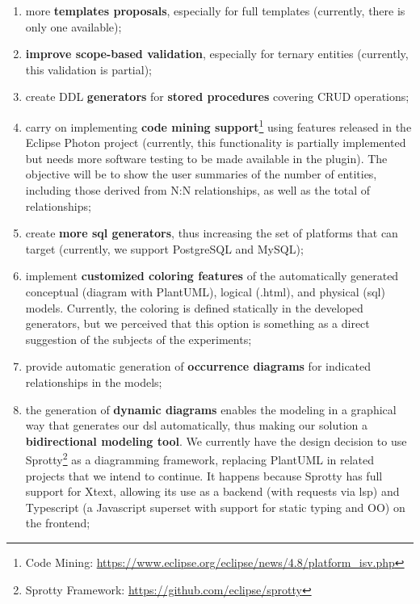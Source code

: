 \begin{enumerate} [label=\roman*.]
    \item more \textbf{templates proposals}, especially for full templates (currently, there is only one available);
    \item \textbf{improve scope-based validation}, especially for ternary entities (currently, this validation is partial);
    \item create DDL \textbf{generators} for \textbf{stored procedures} covering CRUD operations;
    \item carry on implementing  \textbf{code mining support}\footnote {Code Mining: \url{https://www.eclipse.org/eclipse/news/4.8/platform_isv.php}} using features released in the Eclipse Photon project (currently, this functionality is partially implemented but needs more software testing to be made available in the plugin).
    The objective will be to show the user summaries of the number of entities, including those derived from N:N relationships, as well as the total of relationships;
    \item create \textbf{more \ac{sql} generators}, thus increasing the set of platforms that can target (currently, we support PostgreSQL and MySQL);
    \item implement \textbf{customized coloring features} of the automatically generated conceptual (diagram with PlantUML), logical (.html), and physical (\ac{sql}) models. 
    Currently, the coloring is defined statically in the developed generators, but we perceived that this option is something as a direct suggestion of the subjects of the experiments;
    \item provide automatic generation of \textbf{occurrence diagrams} for indicated relationships in the models;
    \item the generation of \textbf{dynamic diagrams} enables the modeling in a graphical way that generates our \ac{dsl} automatically, thus making our solution a \textbf{bidirectional modeling tool}. We currently have the design decision to use Sprotty\footnote{Sprotty Framework: \url{https://github.com/eclipse/sprotty}} as a diagramming framework, replacing PlantUML in related projects that we intend to continue. It happens because Sprotty has full support for Xtext, allowing its use as a backend (with requests via \ac{lsp}) and Typescript (a Javascript superset with support for static typing and OO) on the frontend;

\end{enumerate}
